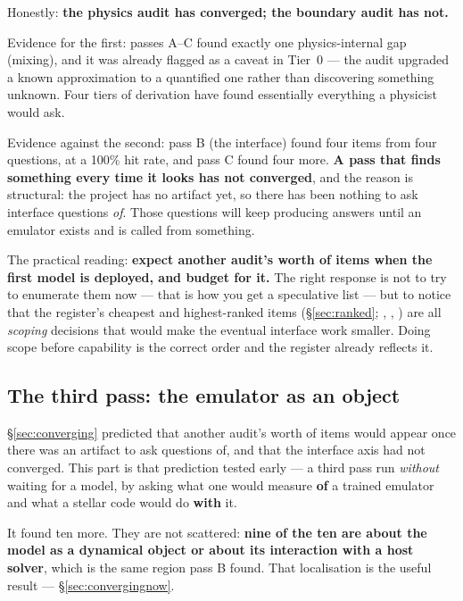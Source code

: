 Honestly: \textbf{the physics audit has converged; the boundary audit has not.}

Evidence for the first: passes A--C found exactly one physics-internal gap
(mixing), and it was already flagged as a caveat in Tier~0 --- the audit
upgraded a known approximation to a quantified one rather than discovering
something unknown. Four tiers of derivation have found essentially everything a
physicist would ask.

Evidence against the second: pass B (the interface) found four items from four
questions, at a 100\% hit rate, and pass C found four more. \textbf{A pass that
finds something every time it looks has not converged}, and the reason is
structural: the project has no artifact yet, so there has been nothing to ask
interface questions \emph{of}. Those questions will keep producing answers until
an emulator exists and is called from something.

The practical reading: \textbf{expect another audit's worth of items when the
first model is deployed, and budget for it.} The right response is not to try
to enumerate them now --- that is how you get a speculative list --- but to
notice that the register's cheapest and highest-ranked items
(\S\ref{sec:ranked}; , , ) are all \emph{scoping}
decisions that would make the eventual interface work smaller.
Doing scope before capability is the correct order and the register already
reflects it.

\subsection{The third pass: the emulator as an object}
\label{sec:emulatorobject}

\S\ref{sec:converging} predicted that another audit's worth of items would
appear once there was an artifact to ask questions of, and that the interface
axis had not converged. This part is that prediction tested early --- a third
pass run \emph{without} waiting for a model, by asking what one would measure
\textbf{of} a trained emulator and what a stellar code would do \textbf{with}
it.

It found ten more. They are not scattered: \textbf{nine of the ten are about the
model as a dynamical object or about its interaction with a host solver}, which
is the same region pass B found. That localisation is the useful result ---
\S\ref{sec:convergingnow}.

